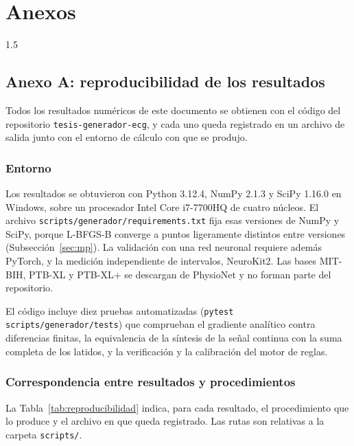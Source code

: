 \section{Anexos}
\begin{spacing}{1.5}

\subsection{Anexo A: reproducibilidad de los resultados}\label{anexo:reproducibilidad}

Todos los resultados numéricos de este documento se obtienen con el código del repositorio \texttt{tesis-generador-ecg}, y cada uno queda registrado en un archivo de salida junto con el entorno de cálculo con que se produjo.

\subsubsection{Entorno}

Los resultados se obtuvieron con Python 3.12.4, NumPy 2.1.3 y SciPy 1.16.0 en Windows, sobre un procesador Intel Core i7-7700HQ de cuatro núcleos. El archivo \texttt{scripts/generador/requirements.txt} fija esas versiones de NumPy y SciPy, porque L-BFGS-B converge a puntos ligeramente distintos entre versiones (Subsección~\ref{sec:mp}). La validación con una red neuronal requiere además PyTorch, y la medición independiente de intervalos, NeuroKit2. Las bases MIT-BIH, PTB-XL y PTB-XL+ se descargan de PhysioNet y no forman parte del repositorio.

El código incluye diez pruebas automatizadas (\texttt{pytest scripts/generador/tests}) que comprueban el gradiente analítico contra diferencias finitas, la equivalencia de la síntesis de la señal continua con la suma completa de los latidos, y la verificación y la calibración del motor de reglas.

\subsubsection{Correspondencia entre resultados y procedimientos}

La Tabla~\ref{tab:reproducibilidad} indica, para cada resultado, el procedimiento que lo produce y el archivo en que queda registrado. Las rutas son relativas a la carpeta \texttt{scripts/}.


\end{spacing}
